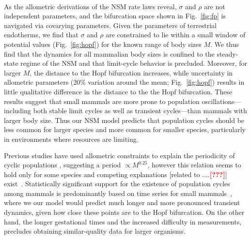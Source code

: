 \documentclass{pnastwo}
\newcommand{\sid}[1]{\textcolor{red}{\bf [#1]}}
\begin{document}
\begin{article}
 \\
As the allometric derivations of the NSM rate laws reveal, $\sigma$ and
$\rho$ are not independent parameters, and the bifurcation space shown in
Fig.~\ref{fig:fp} is navigated via covarying parameters.  Given the
parameters of terrestrial endotherms, we find that $\sigma$ and $\rho$ are
constrained to lie within a small window of potential values
(Fig.~\ref{fig:hopf}) for the known range of body sizes $M$.  We thus find
that the dynamics for all mammalian body sizes is confined to the
steady-state regime of the NSM and that  limit-cycle behavior is precluded.
Moreover, for larger $M$, the distance to the Hopf bifurcation increases,
while uncertainty in allometric parameters (20\% variation around the mean;
Fig.~\ref{fig:hopf}) results in little qualitative difference in the distance
to the the Hopf bifurcation. These results suggest that small mammals are
more prone to population oscillations---including both stable limit cycles as
well as transient cycles---than mammals with larger body size.  Thus our NSM
model predicts that population cycles should be less common for larger
species and more common for smaller species, particularly in environments
where resources are limiting.%

Previous studies have used allometric constraints to explain the periodicity
of cyclic populations
\cite{CalderIII:1983jd,Peterson:1984hj,Krukonis:1991fk}, suggesting a period
$\propto M^{0.25}$, however this relation seems to hold only for some species
\cite{Hendriks:2012fc} and competing explanations [related to ....\sid{???}]
exist~\cite{Kendall:1999iy,Hogstedt:2005cr}.
Statistically significant support for the existence of population cycles
among mammals is predominantly based on time series for small
mammals~\cite{Kendall:1998hl}, where we our model would predict much longer
and more pronounced transient dynamics, given how close these points are to
the Hopf bifurcation.  On the other hand, the longer gestational times and
the increased difficulty in measurements, precludes obtaining similar-quality
data for larger organisms.
\\


\end{article}
\end{document}
